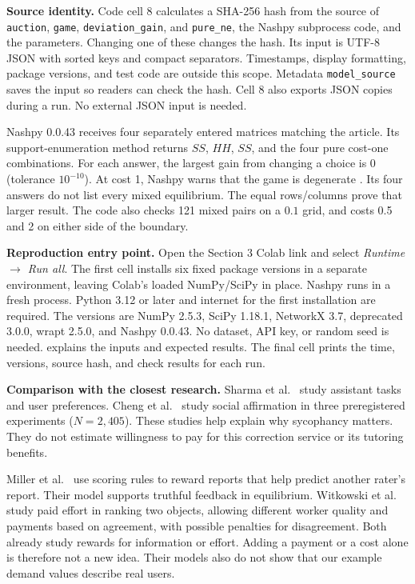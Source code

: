 \textbf{Source identity.} Code cell 8 calculates a SHA-256 hash from the source of \texttt{auction}, \texttt{game}, \texttt{deviation\_gain}, and \texttt{pure\_ne}, the Nashpy subprocess code, and the parameters. Changing one of these changes the hash. Its input is UTF-8 JSON with sorted keys and compact separators. Timestamps, display formatting, package versions, and test code are outside this scope. Metadata \texttt{model\_source} saves the input so readers can check the hash. Cell 8 also exports JSON copies during a run. No external JSON input is needed.

Nashpy 0.0.43 receives four separately entered matrices matching the article. Its support-enumeration method returns $SS$, $HH$, $SS$, and the four pure cost-one combinations. For each answer, the largest gain from changing a choice is 0 (tolerance $10^{-10}$). At cost 1, Nashpy warns that the game is degenerate \cite{nashpy2026}. Its four answers do not list every mixed equilibrium. The equal rows/columns prove that larger result. The code also checks 121 mixed pairs on a $0.1$ grid, and costs 0.5 and 2 on either side of the boundary.

\textbf{Reproduction entry point.} Open the Section 3 Colab link and select \emph{Runtime $\rightarrow$ Run all}. The first cell installs six fixed package versions in a separate environment, leaving Colab's loaded NumPy/SciPy in place. Nashpy runs in a fresh process. Python 3.12 or later and internet for the first installation are required. The versions are NumPy 2.5.3, SciPy 1.18.1, NetworkX 3.7, deprecated 3.0.0, wrapt 2.5.0, and Nashpy 0.0.43. No dataset, API key, or random seed is needed.  explains the inputs and expected results. The final cell prints the time, versions, source hash, and check results for each run.

\noindent\textbf{Comparison with the closest research.}
Sharma et al.\ \cite{sharma2024} study assistant tasks and user preferences. Cheng et al.\ \cite{cheng2026} study social affirmation in three preregistered experiments ($N=2{,}405$). These studies help explain why sycophancy matters. They do not estimate willingness to pay for this correction service or its tutoring benefits.

Miller et al.\ \cite{miller2005} use scoring rules to reward reports that help predict another rater's report. Their model supports truthful feedback in equilibrium. Witkowski et al.\ \cite{witkowski2013} study paid effort in ranking two objects, allowing different worker quality and payments based on agreement, with possible penalties for disagreement. Both already study rewards for information or effort. Adding a payment or a cost alone is therefore not a new idea. Their models also do not show that our example demand values describe real users.

